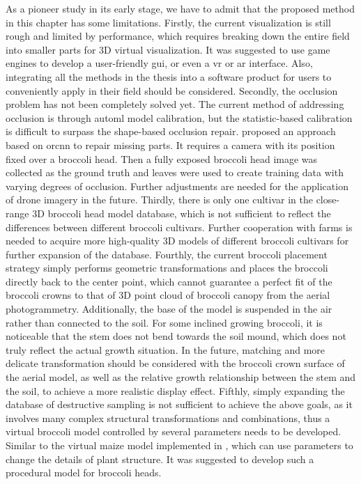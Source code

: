 As a pioneer study in its early stage, we have to admit that the proposed method in this chapter has some limitations. 
Firstly, the current visualization is still rough and limited by performance, which requires breaking down the entire field into smaller parts for 3D virtual visualization. It was suggested to use game engines to develop a user-friendly \gls{gui}, or even a \gls{vr} or \gls{ar} interface. Also, integrating all the methods in the thesis into a software product for users to conveniently apply in their field should be considered. 
Secondly, the occlusion problem has not been completely solved yet. The current method of addressing occlusion is through \gls{automl} model calibration, but the statistic-based calibration is difficult to surpass the shape-based occlusion repair. \citet{blok_image_2021} proposed an approach based on \gls{orcnn} to repair missing parts. It requires a camera with its position fixed over a broccoli head. Then a fully exposed broccoli head image was collected as the ground truth and leaves were used to create training data with varying degrees of occlusion. Further adjustments are needed for the application of drone imagery in the future. 
Thirdly, there is only one cultivar in the close-range 3D broccoli head model database, which is not sufficient to reflect the differences between different broccoli cultivars. Further cooperation with farms is needed to acquire more high-quality 3D models of different broccoli cultivars for further expansion of the database. 
Fourthly, the current broccoli placement strategy simply performs geometric transformations and places the broccoli directly back to the center point, which cannot guarantee a perfect fit of the broccoli crowns to that of 3D point cloud of broccoli canopy from the aerial photogrammetry. Additionally, the base of the model is suspended in the air rather than connected to the soil. For some inclined growing broccoli, it is noticeable that the stem does not bend towards the soil mound, which does not truly reflect the actual growth situation. In the future, matching and more delicate transformation should be considered with the broccoli crown surface of the aerial model, as well as the relative growth relationship between the stem and the soil, to achieve a more realistic display effect.
Fifthly, simply expanding the database of destructive sampling is not sufficient to achieve the above goals, as it involves many complex structural transformations and combinations, thus a  virtual broccoli model controlled by several parameters needs to be developed. Similar to the virtual maize model implemented in \citet{cieslak_l-system_2021}, which can use parameters to change the details of plant structure. It was suggested to develop such a procedural model for broccoli heads. 

